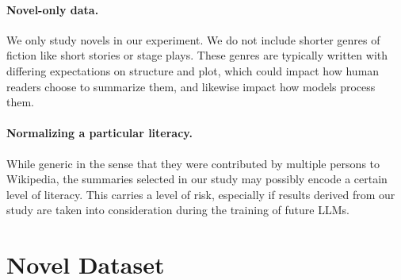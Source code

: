 \documentclass{article} %
\begin{document}
\paragraph{Novel-only data.} We only study novels in our experiment.
We do not include shorter genres of fiction like short stories or stage plays.
These genres are typically written with differing expectations on structure and plot, which could impact how human readers choose to summarize them, and likewise impact how models process them.

\paragraph{Normalizing a particular literacy.}
While generic in the sense that they were contributed by multiple persons to Wikipedia, the summaries selected in our study may possibly encode a certain level of literacy.
This carries a level of risk, especially if results derived from our study are taken into consideration during the training of future LLMs.




\newpage 

\appendix
\section{Novel Dataset}\label{app:novels}
\end{document}

